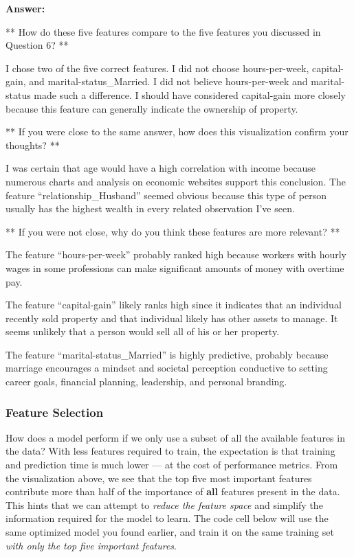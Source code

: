 \documentclass[11pt]{article}
\begin{document}
    \textbf{Answer:}

** How do these five features compare to the five features you discussed
in Question 6? **

I chose two of the five correct features. I did not choose
hours-per-week, capital-gain, and marital-status\_Married. I did not
believe hours-per-week and marital-status made such a difference. I
should have considered capital-gain more closely because this feature
can generally indicate the ownership of property.

** If you were close to the same answer, how does this visualization
confirm your thoughts? **

I was certain that age would have a high correlation with income because
numerous charts and analysis on economic websites support this
conclusion. The feature ``relationship\_Husband'' seemed obvious because
this type of person usually has the highest wealth in every related
observation I've seen.

** If you were not close, why do you think these features are more
relevant? **

The feature ``hours-per-week'' probably ranked high because workers with
hourly wages in some professions can make significant amounts of money
with overtime pay.

The feature ``capital-gain'' likely ranks high since it indicates that
an individual recently sold property and that individual likely has
other assets to manage. It seems unlikely that a person would sell all
of his or her property.

The feature ``marital-status\_Married'' is highly predictive, probably
because marriage encourages a mindset and societal perception conductive
to setting career goals, financial planning, leadership, and personal
branding.

    \hypertarget{feature-selection}{%
\subsubsection{Feature Selection}\label{feature-selection}}

How does a model perform if we only use a subset of all the available
features in the data? With less features required to train, the
expectation is that training and prediction time is much lower --- at
the cost of performance metrics. From the visualization above, we see
that the top five most important features contribute more than half of
the importance of \textbf{all} features present in the data. This hints
that we can attempt to \emph{reduce the feature space} and simplify the
information required for the model to learn. The code cell below will
use the same optimized model you found earlier, and train it on the same
training set \emph{with only the top five important features}.
\end{document}
